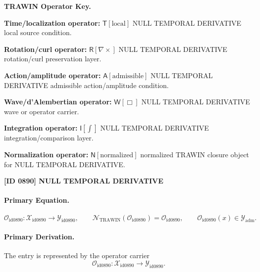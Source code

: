 \par\vspace{0.45\baselineskip}
\noindent\begin{minipage}[t]{\linewidth}
\begingroup
\small
\raggedright
\textbf{TRAWIN Operator Key.}\par
\noindent\textbf{Time/localization operator:} $\mathsf{T}\!\left[\mathrm{local}\right]$ NULL TEMPORAL DERIVATIVE local source condition.\par
\noindent\textbf{Rotation/curl operator:} $\mathsf{R}\!\left[\nabla\times\right]$ NULL TEMPORAL DERIVATIVE rotation/curl preservation layer.\par
\noindent\textbf{Action/amplitude operator:} $\mathsf{A}\!\left[\mathrm{admissible}\right]$ NULL TEMPORAL DERIVATIVE admissible action/amplitude condition.\par
\noindent\textbf{Wave/d'Alembertian operator:} $\mathsf{W}\!\left[\Box\right]$ NULL TEMPORAL DERIVATIVE wave or operator carrier.\par
\noindent\textbf{Integration operator:} $\mathsf{I}\!\left[\int\right]$ NULL TEMPORAL DERIVATIVE integration/comparison layer.\par
\noindent\textbf{Normalization operator:} $\mathsf{N}\!\left[\mathrm{normalized}\right]$ normalized TRAWIN closure object for NULL TEMPORAL DERIVATIVE.\par
\endgroup
\end{minipage}

\clearpage
\noindent\textbf{[ID 0890] NULL TEMPORAL DERIVATIVE}\par
\vspace{0.35em}
\paragraph{Primary Equation.}
\[
\mathcal{O}_{\mathrm{id0890}}:\mathcal{X}_{\mathrm{id0890}}\longrightarrow \mathcal{Y}_{\mathrm{id0890}},\qquad
\mathcal{N}_{\mathrm{TRAWIN}}(\mathcal{O}_{\mathrm{id0890}})=\mathcal{O}_{\mathrm{id0890}},\qquad
\mathcal{O}_{\mathrm{id0890}}(x)\in\mathcal{Y}_{\mathrm{adm}}.
\]

\paragraph{Primary Derivation.} The entry is represented by the operator carrier\[
\mathcal{O}_{\mathrm{id0890}}:\mathcal{X}_{\mathrm{id0890}}\longrightarrow \mathcal{Y}_{\mathrm{id0890}}.
\]

